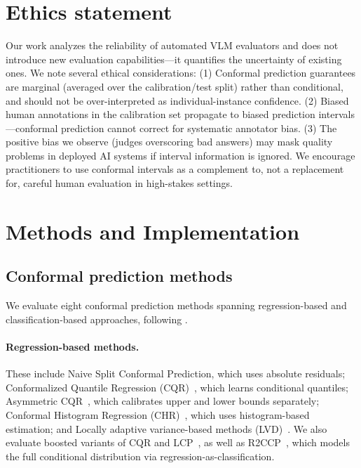\documentclass{article}
\begin{document}
\section*{Ethics statement}
Our work analyzes the reliability of automated VLM evaluators and does not introduce new evaluation capabilities---it quantifies the uncertainty of existing ones. We note several ethical considerations: (1) Conformal prediction guarantees are marginal (averaged over the calibration/test split) rather than conditional, and should not be over-interpreted as individual-instance confidence. (2) Biased human annotations in the calibration set propagate to biased prediction intervals---conformal prediction cannot correct for systematic annotator bias. (3) The positive bias we observe (judges overscoring bad answers) may mask quality problems in deployed AI systems if interval information is ignored. We encourage practitioners to use conformal intervals as a complement to, not a replacement for, careful human evaluation in high-stakes settings.





\appendix

\section{Methods and Implementation}
\label{app:methods}

\subsection{Conformal prediction methods}
\label{sec:appendix_cp_methods}

We evaluate eight conformal prediction methods spanning regression-based and classification-based approaches, following \citet{sheng2025analyzing}.

\paragraph{Regression-based methods.}
These include Naive Split Conformal Prediction, which uses absolute residuals; Conformalized Quantile Regression (CQR)~\citep{romano2019conformalized}, which learns conditional quantiles; Asymmetric CQR~\citep{sesia2019comparison}, which calibrates upper and lower bounds separately; Conformal Histogram Regression (CHR)~\citep{sesia2021conformal}, which uses histogram-based estimation; and Locally adaptive variance-based methods (LVD)~\citep{lin2021locally}. We also evaluate boosted variants of CQR and LCP~\citep{xie2025boosted}, as well as R2CCP~\citep{guha2024conformal}, which models the full conditional distribution via regression-as-classification.
\end{document}
